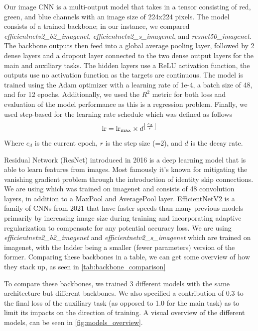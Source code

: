 \documentclass[12pt,a4paper,oneside]{article}
\begin{document}
Our image CNN is a multi-output model that takes in a tensor consisting of red, green, and blue channels with an image size of 224x224 pixels. The model consists of a trained backbone; in our instance, we compared \textit{efficientnetv2\_b2\_imagenet}, \textit{efficientnetv2\_s\_imagenet}, and \textit{resnet50\_imagenet}. The backbone outputs then feed into a global average pooling layer, followed by 2 dense layers and a dropout layer connected to the two dense output layers for the main and auxiliary tasks. The hidden layers use a ReLU activation function, the outputs use no activation function as the targets are continuous. The model is trained using the Adam optimizer with a learning rate of 1e-4, a batch size of 48, and for 12 epochs. Additionally, we used the $R^2$ metric for both loss and evaluation of the model performance as this is a regression problem. Finally, we used step-based for the learning rate schedule which was defined as follows
\[
    \text{lr} = \text{lr}_\text{max} \times d^{\floor*{\frac{e_d}{r}}}
\]
Where $e_d$ is the current epoch, $r$ is the step size (=2), and $d$ is the decay rate.

\smallskip
Residual Network (ResNet) \cite{he2016identity} introduced in 2016 is a deep learning model that is able to learn features from images. Most famously it's known for mitigating the vanishing gradient problem through the introduction of identity skip connections. We are using  which was trained on imagenet and consists of 48 convolution layers, in addition to a MaxPool and AveragePool layer. EfficientNetV2 \cite{tan2021efficientnetv2} is a family of CNNs from 2021 that have faster speeds than many previous models primarily by increasing image size during training and incorporating adaptive regularization to compensate for any potential accuracy loss. We are using \textit{efficientnetv2\_b2\_imagenet} and \textit{efficientnetv2\_s\_imagenet} which are trained on imagenet, with the ladder being a smaller (fewer parameters) version of the former. Comparing these backbones in a table, we can get some overview of how they stack up, as seen in \ref{tab:backbone_comparison}

To compare these backbones, we trained 3 different models with the same architecture but different backbones. We also specified a contribution of 0.3 to the final loss of the auxiliary task (as opposed to 1.0 for the main task) as to limit its impacts on the direction of training. A visual overview of the different models, can be seen in \ref{fig:models_overview}. 
\end{document}
